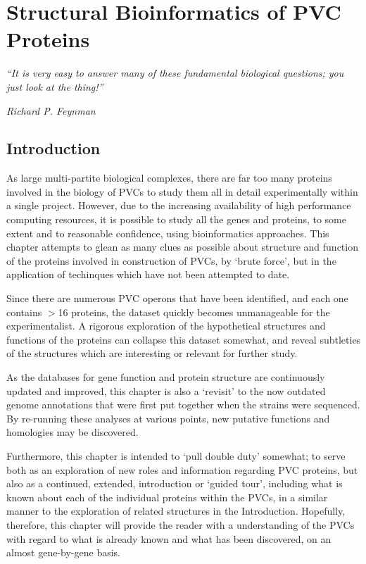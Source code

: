 \chapter{Structural Bioinformatics of PVC Proteins}\label{structbioinfo}

\epigraph{\emph{``It is very easy to answer many of these fundamental biological questions; you just look at the thing!''}}{\textit{Richard P. Feynman}}

\section{Introduction}




As large multi-partite biological complexes, there are far too many proteins involved in the biology of PVCs to study them all in detail experimentally within a single project. However, due to the increasing availability of high performance computing resources, it is possible to study all the genes and proteins, to some extent and to reasonable confidence, using bioinformatics approaches. This chapter attempts to glean as many clues as possible about structure and function of the proteins involved in construction of PVCs, by `brute force', but in the application of techinques which have not been attempted to date.

Since there are numerous PVC operons that have been identified, and each one contains $>$16 proteins, the dataset quickly becomes unmanageable for the experimentalist. A rigorous exploration of the hypothetical structures and functions of the proteins can collapse this dataset somewhat, and reveal subtleties of the structures which are interesting or relevant for further study. 

As the databases for gene function and protein structure are continuously updated and improved, this chapter is also a `revisit' to the now outdated genome annotations that were first put together when the strains were sequenced. By re-running these analyses at various points, new putative functions and homologies may be discovered.

Furthermore, this chapter is intended to `pull double duty' somewhat; to serve both as an exploration of new roles and information regarding PVC proteins, but also as a continued, extended, introduction or `guided tour', including what is known about each of the individual proteins within the PVCs, in a similar manner to the exploration of related structures in the Introduction. Hopefully, therefore, this chapter will provide the reader with a understanding of the PVCs with regard to what is already known and what has been discovered, on an almost gene-by-gene basis.

